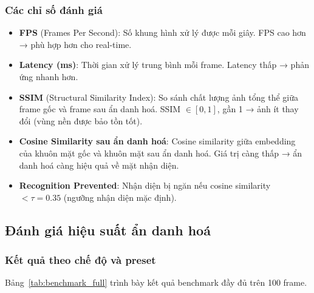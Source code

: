 \subsubsection{Các chỉ số đánh giá}

\begin{itemize}
    \item \textbf{FPS} (Frames Per Second): Số khung hình xử lý được mỗi giây. FPS cao hơn → phù hợp hơn cho real-time.
    \item \textbf{Latency (ms)}: Thời gian xử lý trung bình mỗi frame. Latency thấp → phản ứng nhanh hơn.
    \item \textbf{SSIM} (Structural Similarity Index): So sánh chất lượng ảnh tổng thể giữa frame gốc và frame sau ẩn danh hoá. SSIM $\in [0,1]$, gần 1 → ảnh ít thay đổi (vùng nền được bảo tồn tốt).
    \item \textbf{Cosine Similarity sau ẩn danh hoá}: Cosine similarity giữa embedding của khuôn mặt gốc và khuôn mặt sau ẩn danh hoá. Giá trị càng thấp → ẩn danh hoá càng hiệu quả về mặt nhận diện.
    \item \textbf{Recognition Prevented}: Nhận diện bị ngăn nếu cosine similarity $< \tau = 0.35$ (ngưỡng nhận diện mặc định).
\end{itemize}

\subsection{Đánh giá hiệu suất ẩn danh hoá}
\label{subsec:benchmark}

\subsubsection{Kết quả theo chế độ và preset}

Bảng~\ref{tab:benchmark_full} trình bày kết quả benchmark đầy đủ trên 100 frame.

